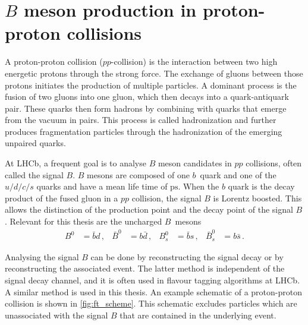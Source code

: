 \section{$B$ meson production in proton-proton collisions}

A proton-proton collision ($pp$-collision) is the interaction between two high energetic protons through the strong force.
The exchange of gluons between those protons initiates the production of multiple particles. 
A dominant process is the fusion of two gluons into one gluon, which then decays into a quark-antiquark pair.
These quarks then form hadrons by combining with quarks that emerge from the vacuum in pairs.
This process is called hadronization and further produces fragmentation particles through the hadronization of the emerging unpaired quarks.

At LHCb, a frequent goal is to analyse $B$ meson candidates in $pp$ collisions, often called the signal $B$.
$B$ mesons are composed of one $b$~quark and one of the $u/d/c/s$ quarks and have a mean life time of $\unit{\pico\second}$.
When the $b$ quark is the decay product of the fused gluon in a $pp$ collision, the signal $B$ is Lorentz boosted.
This allows the distinction of the production point and the decay point of the signal $B$.
Relevant for this thesis are the uncharged $B$~mesons
\begin{align*}
    B^0 &= \bar{b}d \, , & \bar{B}^0 &= b\bar{d} \, , & B_s^0 &= \bar{b}s \, , & \bar{B}_s^0 &= b\bar{s} \, .
\end{align*}

Analysing the signal $B$ can be done by reconstructing the signal decay or by reconstructing the associated event. 
The latter method is independent of the signal decay channel, and it is often used in flavour tagging algorithms at LHCb. 
A similar method is used in this thesis.
An example schematic of a proton-proton collision is shown in \autoref{fig:ft_scheme}. 
This schematic excludes particles which are unassociated with the signal $B$ that are contained in the underlying event.

